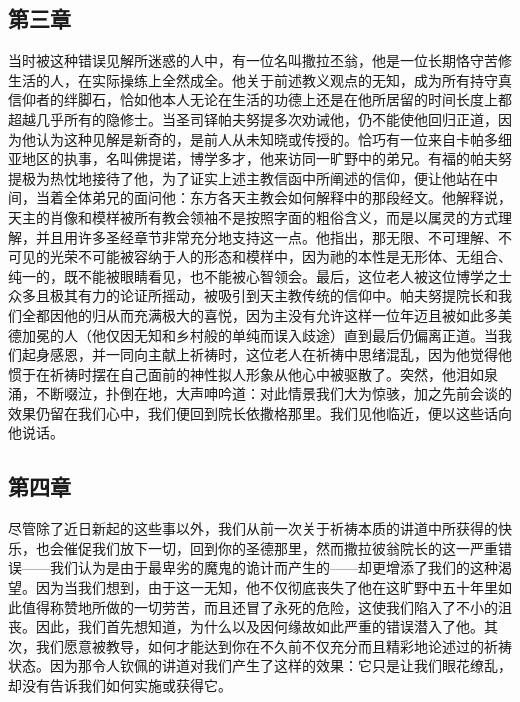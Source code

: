 \subsection{第三章}

\par

当时被这种错误见解所迷惑的人中，有一位名叫撒拉丕翁，他是一位长期恪守苦修生活的人，在实际操练上全然成全。他关于前述教义观点的无知，成为所有持守真信仰者的绊脚石，恰如他本人无论在生活的功德上还是在他所居留的时间长度上都超越几乎所有的隐修士。当圣司铎帕夫努提多次劝诫他，仍不能使他回归正道，因为他认为这种见解是新奇的，是前人从未知晓或传授的。恰巧有一位来自卡帕多细亚地区的执事，名叫佛提诺，博学多才，他来访同一旷野中的弟兄。有福的帕夫努提极为热忱地接待了他，为了证实上述主教信函中所阐述的信仰，便让他站在中间，当着全体弟兄的面问他：东方各天主教会如何解释中的那段经文。他解释说，天主的肖像和模样被所有教会领袖不是按照字面的粗俗含义，而是以属灵的方式理解，并且用许多圣经章节非常充分地支持这一点。他指出，那无限、不可理解、不可见的光荣不可能被容纳于人的形态和模样中，因为祂的本性是无形体、无组合、纯一的，既不能被眼睛看见，也不能被心智领会。最后，这位老人被这位博学之士众多且极其有力的论证所摇动，被吸引到天主教传统的信仰中。帕夫努提院长和我们全都因他的归从而充满极大的喜悦，因为主没有允许这样一位年迈且被如此多美德加冕的人（他仅因无知和乡村般的单纯而误入歧途）直到最后仍偏离正道。当我们起身感恩，并一同向主献上祈祷时，这位老人在祈祷中思绪混乱，因为他觉得他惯于在祈祷时摆在自己面前的神性拟人形象从他心中被驱散了。突然，他泪如泉涌，不断啜泣，扑倒在地，大声呻吟道：对此情景我们大为惊骇，加之先前会谈的效果仍留在我们心中，我们便回到院长依撒格那里。我们见他临近，便以这些话向他说话。\par


\subsection{第四章}

\par

尽管除了近日新起的这些事以外，我们从前一次关于祈祷本质的讲道中所获得的快乐，也会催促我们放下一切，回到你的圣德那里，然而撒拉彼翁院长的这一严重错误——我们认为是由于最卑劣的魔鬼的诡计而产生的——却更增添了我们的这种渴望。因为当我们想到，由于这一无知，他不仅彻底丧失了他在这旷野中五十年里如此值得称赞地所做的一切劳苦，而且还冒了永死的危险，这使我们陷入了不小的沮丧。因此，我们首先想知道，为什么以及因何缘故如此严重的错误潜入了他。其次，我们愿意被教导，如何才能达到你在不久前不仅充分而且精彩地论述过的祈祷状态。因为那令人钦佩的讲道对我们产生了这样的效果：它只是让我们眼花缭乱，却没有告诉我们如何实施或获得它。\par


